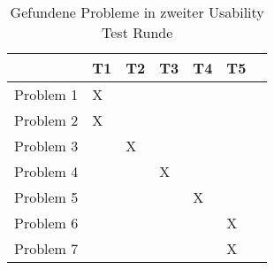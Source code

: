 \begin{table}[H]
    \caption{Gefundene Probleme in zweiter Usability Test Runde}\label{tbl:2ndUsabilityTestsProblems}
    \begin{tabular}{l||l|l|l|l|l|l}
                    & T1    & T2    & T3    & T4    & T5    \\ \hline
        Problem 1   & X     &       &       &       &       \\
        Problem 2   & X     &       &       &       &       \\
        Problem 3   &       & X     &       &       &       \\
        Problem 4   &       &       & X     &       &       \\
        Problem 5   &       &       &       & X     &       \\
        Problem 6   &       &       &       &       & X     \\
        Problem 7   &       &       &       &       & X     \\
    \end{tabular}    
\end{table}

